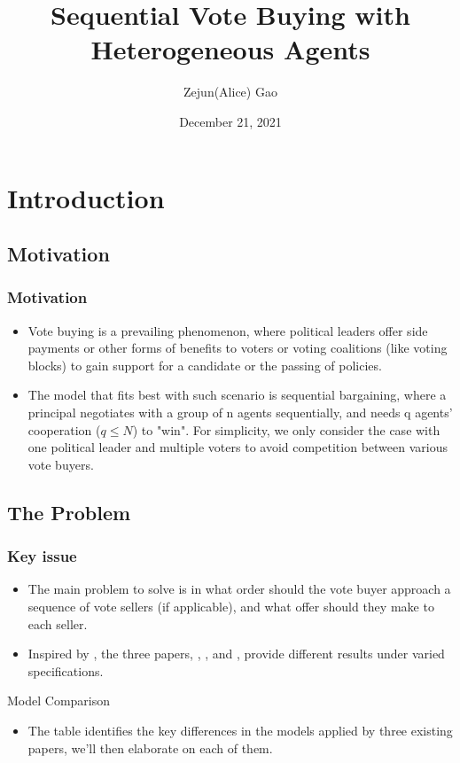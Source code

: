 \documentclass[pdflatex]{beamer}
\title[Sequential Bargaining]{Sequential Vote Buying with Heterogeneous Agents}
\author[Gao]{Zejun(Alice) Gao}
\institute[JHU]{Johns Hopkins University}
\date[\today]{December 21, 2021}
\providecommand{\TableDir}{\econtexRoot/Tables}
\begin{document}


\begin{frame}[plain]
  \titlepage
\end{frame}


\section{Introduction}
\subsection{Motivation}

\begin{frame}
\frametitle{Motivation}
	\begin{itemize}
		\item Vote buying is a prevailing phenomenon, where political leaders offer side payments or other forms of benefits to voters or voting coalitions (like voting blocks) to gain support for a candidate or the passing of policies.
		\item The model that fits best with such scenario is sequential bargaining, where a principal negotiates with a group of n agents sequentially, and needs q agents' cooperation ($q \leq N$) to "win". For simplicity, we only consider the case with one political leader and multiple voters to avoid competition between various vote buyers.
	\end{itemize}
\end{frame}

\subsection{The Problem}
\begin{frame}
\frametitle{Key issue}
	\begin{itemize}
		\item The main problem to solve is in what order should the vote buyer approach a sequence of vote sellers (if applicable), and what offer should they make to each seller.
		\item Inspired by \cite{Cai03}, the three papers, \cite{Xiao}, \cite{InOCoHoldUP}, and \cite{CnZSeqVB}, provide different results under varied specifications.
	\end{itemize}	
\end{frame}

\begin{frame}[shrink = 25]{Model Comparison}
	\bigskip
	\bigskip
	
	\bigskip
	\begin{itemize}
		\item The table identifies the key differences in the models applied by three existing papers, we'll then elaborate on each of them.
	\end{itemize}
	
\end{frame}
\end{document}
